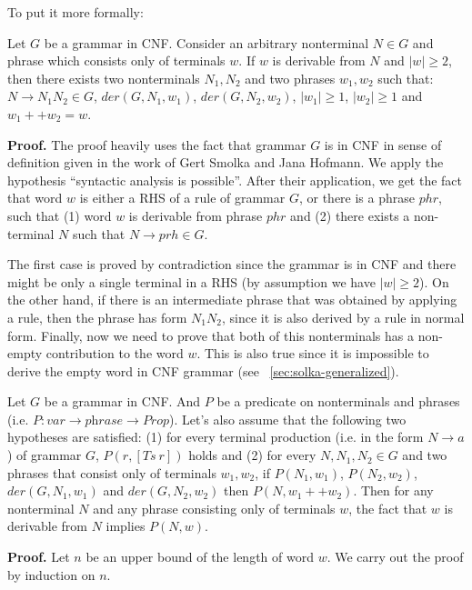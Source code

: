 To put it more formally: 
\begin{lemma} \label{lemma:chomskyind1}
Let $G$ be a grammar in CNF. Consider an arbitrary nonterminal $N \in G$ and phrase which consists only of terminals $w$. 
If $w$ is derivable from $N$ and $|w| \ge 2$, then there exists two nonterminals $N_1, N_2$ and two phrases $w_1, w_2$ such that: $N \to N_1 N_2 \in G$, $der(G, N_1, w_1)$, $der(G, N_2, w_2)$, $|w_1| \ge 1$, $|w_2| \ge 1$ and $w_1 ++ w_2 = w$.
\end{lemma}


\textbf{Proof.}
The proof heavily uses the fact that grammar $G$ is in CNF in sense of definition given in the work of Gert Smolka and Jana Hofmann.
We apply the hypothesis ``syntactic analysis is possible''. After their application, we get the fact that word $w$ is either a RHS of a rule of grammar $G$, or there is a phrase $phr$, such that (1) word $w$ is derivable from phrase $phr$ and (2) there exists a non-terminal $N$ such that $N \to prh \in G$.

The first case is proved by contradiction since the grammar is in CNF and there might be only a single terminal in a RHS (by assumption we have $|w| \ge 2$).
On the other hand, if there is an intermediate phrase that was obtained by applying a rule, then the phrase has form $N_1 N_2$, since it is also derived by a rule in normal form.
Finally, now we need to prove that both of this nonterminals has a non-empty contribution to the word $w$. This is also true since it is impossible to derive the empty word in CNF grammar (see ~\ref{sec:solka-generalized}).

\begin{lemma}
	Let $G$ be a grammar in CNF. And $P$ be a predicate on nonterminals and phrases (i.e. $P: var \to \textit{phrase} \to \textit{Prop}$).
	Let's also assume that the following two hypotheses are satisfied:
	(1) for every terminal production (i.e. in the form $N \to a$) of grammar $G$, $P(r, [Ts \ r])$ holds and (2) for every $N, N_1, N_2 \in G$ and two phrases that consist only of terminals $w_1, w_2$, if $P(N_1, w_1)$, $P(N_2, w_2)$, $der(G, N_1, w_1)$ and $der(G, N_2, w_2)$ then $P(N, w_1 ++ w_2)$.
	Then for any nonterminal $N$ and any phrase consisting only of terminals $w$, the fact that $w$ is derivable from $N$ implies $P(N,w)$.
\end{lemma}

\textbf{Proof.} 
Let $n$ be an upper bound of the length of word $w$. We carry out the proof by induction on $n$.


